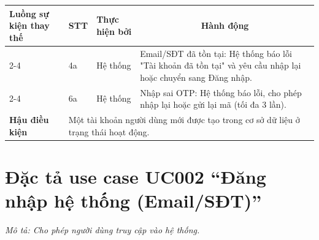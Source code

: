 \begin{longtable}{|p{2.7cm}|p{0.8cm}|p{2.6cm}|p{7.3cm}|}
\cellcolor[HTML]{D5F5E3}\textbf{Luồng sự kiện thay thế} & \cellcolor[HTML]{FDEBD0}\textbf{STT} & \cellcolor[HTML]{FDEBD0}\textbf{Thực hiện bởi} & \multicolumn{1}{c|}{\cellcolor[HTML]{FDEBD0}\textbf{Hành động}} \\ \cline{2-4} 
\cellcolor[HTML]{D5F5E3} & 4a & Hệ thống & Email/SĐT đã tồn tại: Hệ thống báo lỗi "Tài khoản đã tồn tại" và yêu cầu nhập lại hoặc chuyển sang Đăng nhập. \\ \cline{2-4} 
\cellcolor[HTML]{D5F5E3} & 6a & Hệ thống & Nhập sai OTP: Hệ thống báo lỗi, cho phép nhập lại hoặc gửi lại mã (tối đa 3 lần). \\ \hline

\cellcolor[HTML]{D5F5E3}\textbf{Hậu điều kiện} & \multicolumn{3}{p{10.7cm}|}{Một tài khoản người dùng mới được tạo trong cơ sở dữ liệu ở trạng thái hoạt động.} \\ \hline
\end{longtable}
\endgroup

\section{Đặc tả use case UC002 ``Đăng nhập hệ thống (Email/SĐT)''}
\textit{Mô tả: Cho phép người dùng truy cập vào hệ thống.}
\vspace{0.5cm}

\begingroup
\renewcommand{\arraystretch}{1.5}


